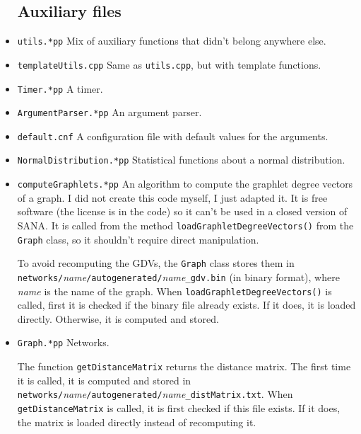 \documentclass[]{article}
\begin{document}
\begin{itemize}

\subsection{Auxiliary files}


\item \texttt{utils.*pp} Mix of auxiliary functions that didn't belong anywhere else.

\item \texttt{templateUtils.cpp} Same as \texttt{utils.cpp}, but with template functions.

\item \texttt{Timer.*pp} A timer.

\item \texttt{ArgumentParser.*pp} An argument parser.

\item \texttt{default.cnf} A configuration file with default values for the arguments.

\item \texttt{NormalDistribution.*pp} Statistical functions about a normal distribution.

\item \texttt{computeGraphlets.*pp} An algorithm to compute the graphlet degree vectors of a graph. I did not create this code myself, I just adapted it. It is free software (the license is in the code) so it can't be used in a closed version of SANA. It is called from the method \texttt{loadGraphletDegreeVectors()} from the \texttt{Graph} class, so it shouldn't require direct manipulation.

To avoid recomputing the GDVs, the \texttt{Graph} class stores them in \\ \texttt{networks/}\textit{name}\texttt{/autogenerated/}\textit{name}\texttt{\_gdv.bin} (in binary format), where \textit{name} is the name of the graph. When \texttt{loadGraphletDegreeVectors()} is called, first it is checked if the binary file already exists. If it does, it is loaded directly. Otherwise, it is computed and stored.

\item \texttt{Graph.*pp} Networks.

The function \texttt{getDistanceMatrix} returns the distance matrix. The first time it is called, it is computed and stored in\\ \texttt{networks/}\textit{name}\texttt{/autogenerated/}\textit{name}\texttt{\_distMatrix.txt}. When \texttt{getDistanceMatrix} is called, it is first checked if this file exists. If it does, the matrix is loaded directly instead of recomputing it.


\end{itemize}
\end{document}
